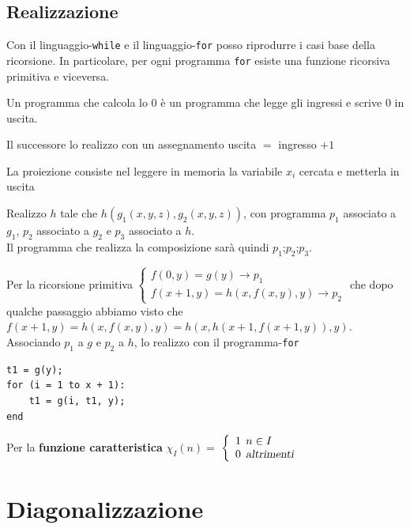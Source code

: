 \documentclass[10pt]{book}
\begin{document}
\subsection{Realizzazione}
Con il linguaggio-\texttt{while} e il linguaggio-\texttt{for} posso riprodurre i casi base della ricorsione. In particolare, per ogni programma \texttt{for} esiste una funzione ricorsiva primitiva e viceversa.\\
\begin{list}{}{}
	\item Un programma che calcola lo $0$ è un programma che legge gli ingressi e scrive $0$ in uscita.
	\item Il successore lo realizzo con un assegnamento uscita $=$ ingresso $ + 1$
	\item La proiezione consiste nel leggere in memoria la variabile $x_i$ cercata e metterla in uscita
	\item Realizzo $h$ tale che $h(g_1(x, y, z), g_2(x, y, z))$, con programma $p_1$ associato a $g_1$, $p_2$ associato a $g_2$ e $p_3$ associato a $h$.\\
Il programma che realizza la composizione sarà quindi $p_1$;$p_2$;$p_3$.\\
	\item Per la ricorsione primitiva
	\begin{math}
		\left\{
		\begin{array}{l}
			f(0, y) = g(y) \rightarrow p_1\\
			f(x + 1, y) = h(x, f(x, y), y) \rightarrow p_2
		\end{array}
		\right.
	\end{math}
	che dopo qualche passaggio abbiamo visto che\\$f(x + 1, y) =  h(x, f(x, y), y) = h(x, h(x + 1, f( x + 1, y)), y)$. Associando $p_1$ a $g$ e $p_2$ a $h$, lo realizzo con il programma-\texttt{for}
	\begin{lstlisting}
t1 = g(y);
for (i = 1 to x + 1):
	t1 = g(i, t1, y);
end
	\end{lstlisting}
\end{list}
Per la \textbf{funzione caratteristica} $\chi_I(n) =$
\begin{math}
		\left\{
		\begin{array}{l}
			1\:\: n \in I\\
			0\:\:\textsl{altrimenti}
		\end{array}
		\right.
\end{math}
\section{Diagonalizzazione}
\end{document}
